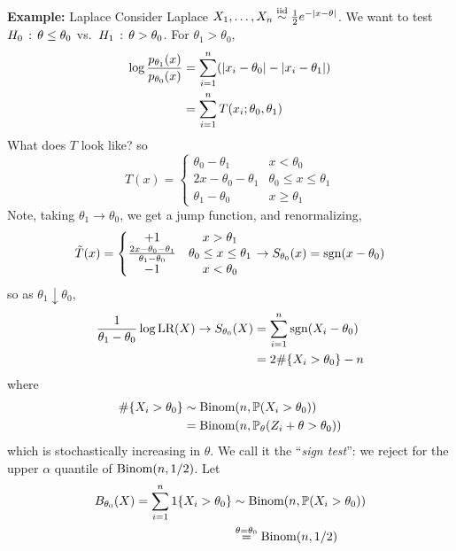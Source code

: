 \begin{example}{\textbf{Example:} Laplace}
    Consider Laplace $X_1, \ldots, X_n \iidsim \frac{1}{2}e^{-\abs{x - \theta}}$. We want to test $H_0 \col \theta \leq \theta_0$ vs.\ $H_1 \col \theta > \theta_0$. For $\theta_1 > \theta_0$,
    \begin{align*}
        \log\frac{p_{\theta_1}(x)}{p_{\theta_0}(x)} &= \sum_{i = 1}^{n}(\abs{x_i - \theta_0} - \abs{x_i - \theta_1})\\
        &= \sum_{i = 1}^{n} T(x_i; \theta_0, \theta_1)
    \end{align*}
    What does $T$ look like?
    so
    \[ T(x) = \left\{\begin{matrix} \theta_0 - \theta_1 & x < \theta_0 \\ 2x - \theta_0 - \theta_1 & \theta_0 \leq x \leq \theta_1 \\ \theta_1 - \theta_0 & x \geq \theta_1 \end{matrix}\right. \]
    Note, taking $\theta_1 \to \theta_0$, we get a jump function, and renormalizing,
    \[ \tilde{T}(x) = \left\{\begin{matrix} +1 & x > \theta_1 \\ \frac{2x - \theta_0 - \theta_1}{\theta_1 - \theta_0} & \theta_0 \leq x \leq \theta_1 \\ -1 & x < \theta_0 \end{matrix}\right. \to S_{\theta_0}(x) = \tt{sgn}(x - \theta_0) \]
    so as $\theta_1 \downarrow \theta_0$,
    \begin{align*}
        \frac{1}{\theta_1 - \theta_0}\log\tt{LR}(X) \to S_{\theta_0}(X) &= \sum_{i = 1}^{n} \tt{sgn}(X_i - \theta_0)\\
        &= 2\#\{X_i > \theta_0\} - n
    \end{align*}
    where
    \begin{align*}
        \#\{X_i > \theta_0\} &\sim \Binom(n, \bb{P}(X_i > \theta_0))\\
        &= \Binom(n, \bb{P}_{\theta}(Z_i + \theta > \theta_0))
    \end{align*}
    which is stochastically increasing in $\theta$. We call it the ``\emph{sign test}'': we reject for the upper $\alpha$ quantile of $\Binom(n, 1/2)$. Let
    \begin{align*}
        B_{\theta_0}(X) = \sum_{i = 1}^{n} 1\{X_i > \theta_0\} &\sim \Binom(n, \bb{P}(X_i > \theta_0))\\
        &\overset{\theta = \theta_0}{=} \Binom(n, 1/2)
    \end{align*}
\end{example}

